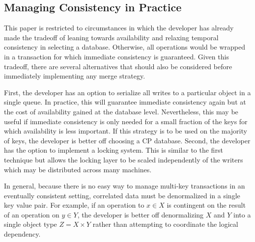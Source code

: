 \documentclass[twoside]{article}
\begin{document}
\begin{multicols}{2}

\section{Managing Consistency in Practice}

This paper is restricted to circumstances in which the
developer has already made the tradeoff of leaning towards
availability and relaxing temporal consistency in selecting a
database. Otherwise, all operations would be wrapped in a transaction
for which immediate consistency is guaranteed. Given this tradeoff,
there are several alternatives that should also be considered before
immediately implementing any merge strategy.

First, the developer has an option to serialize all writes to a
particular object in a single queue. In practice, this will guarantee
immediate consistency again but at the cost of availability gained at
the database level. Nevertheless, this may be useful if immediate
consistency is only needed for a small fraction of the keys for which
availability is less important. If this strategy is to be used on the
majority of keys, the developer is better off choosing a CP database.
Second, the developer has the option to implement a locking
system. This is similar to the first technique but allows the locking
layer to be scaled independently of the writers which may be
distributed across many machines.

In general, because there is no easy way to manage multi-key
transactions in an eventually consistent setting, correlated data must
be denormalized in a single key value pair. For example, if an
operation to $x \in X$ is contingent on the result of an operation on
$y \in Y$, the developer is better off denormalizing $X$ and $Y$ into
a single object type $Z = X \times Y$ rather than attempting to
coordinate the logical dependency.


\end{multicols}
\end{document}
